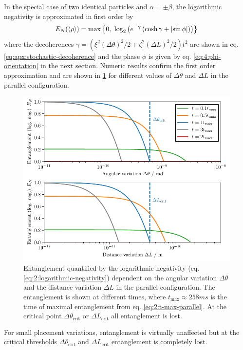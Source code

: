 In the special case of two identical particles and $\alpha=\pm\beta$, the logarithmic negativity is approximated in first order by
\begin{equation}\label{eq:4:log-neg-analytical}
  E_N(\mean{\rho}) = \max\left\{ 0,\ \log_2\left(e^{-\gamma}\left(\cosh\gamma + \abs{\sin \phi}\right)\right) \right\}
\end{equation}
where the decoherences $\gamma = \left(\xi^2(\Delta \theta)^2/2 + \zeta^2(\Delta L)^2/2\right)t^2$ are shown in eq. \eqref{eq:apx:stochastic-decoherence} and the phase $\phi$ is given by eq. \eqref{eq:4:phi-orientation} in the next section.
Numeric results confirm the first order approximation and are shown in \cref{fig:4:EN-variations} for different values of $\Delta \theta$ and $\Delta L$ in the parallel configuration.
\begin{figure}[!htb]
  \centering
  \includegraphics[width=\textwidth]{./../figures/theta-variance/EN-deltaTheta-deltaL.pdf}
  \caption{Entanglement quantified by the logarithmic negativity (eq. \eqref{eq:2:logarithmic-negativity}) dependent on the angular variation $\Delta\theta$ and the distance variation $\Delta L$ in the parallel configuration. The entanglement is shown at different times, where $t_\mathrm{max} \approx 258\si{ms}$ is the time of maximal entanglement from eq. \eqref{eq:2:t-max-parallel}. At the critical point $\Delta \theta_\mathrm{crit}$ or $\Delta L_\mathrm{crit}$ all entanglement is lost.}
  \label{fig:4:EN-variations}
\end{figure}
For small placement variations, entanglement is virtually unaffected but at the critical thresholds $\Delta \theta_\mathrm{crit}$ and $\Delta L_\mathrm{crit}$ entanglement is completely lost.
